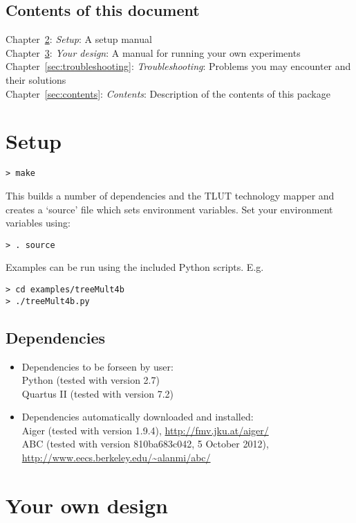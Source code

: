 \documentclass[a4paper,oneside]{memoir}
\begin{document}
\section{Contents of this document}
Chapter~\ref{sec:setup}: \emph{Setup}: A setup manual\\
Chapter~\ref{sec:experiment}: \emph{Your design}: A manual for running your own experiments\\
Chapter~\ref{sec:troubleshooting}: \emph{Troubleshooting}: Problems you may encounter and their solutions\\
Chapter~\ref{sec:contents}: \emph{Contents}: Description of the contents of this package


\clearpage
\chapter{Setup}\label{sec:setup}
\begin{lstlisting}
> make
\end{lstlisting}
This builds a number of dependencies and the TLUT technology mapper and creates a `source' file which sets environment variables. Set your environment variables using:
\begin{lstlisting}
> . source
\end{lstlisting}
Examples can be run using the included Python scripts.
E.g.
\begin{lstlisting}
> cd examples/treeMult4b
> ./treeMult4b.py
\end{lstlisting}

\section{Dependencies}
\begin{itemize}
\item Dependencies to be forseen by user:\\
Python (tested with version 2.7)\\
Quartus II (tested with version 7.2)
\item Dependencies automatically downloaded and installed:\\
Aiger (tested with version 1.9.4), \url{http://fmv.jku.at/aiger/}\\
ABC (tested with version 810ba683c042, 5 October 2012), \url{http://www.eecs.berkeley.edu/\~alanmi/abc/}
\end{itemize}

\clearpage
\chapter{Your own design}\label{sec:experiment}
\end{document}
